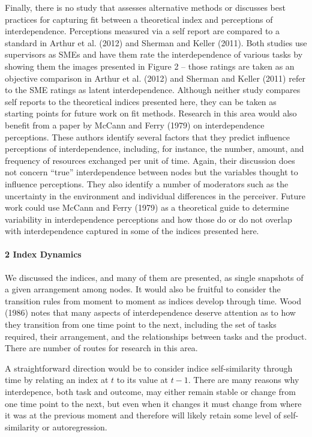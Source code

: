 \documentclass[english,,man]{apa6}
\let\oldparagraph\paragraph
\renewcommand{\paragraph}[1]{\oldparagraph{#1}\mbox{}}
\theoremstyle{definition}
\theoremstyle{definition}
\theoremstyle{definition}
\theoremstyle{remark}
\begin{document}
Finally, there is no study that assesses alternative methods or
discusses best practices for capturing fit between a theoretical index
and perceptions of interdependence. Perceptions measured via a self
report are compared to a standard in Arthur et al. (2012) and Sherman
and Keller (2011). Both studies use supervisors as SMEs and have them
rate the interdependence of various tasks by showing them the images
presented in Figure 2 -- those ratings are taken as an objective
comparison in Arthur et al. (2012) and Sherman and Keller (2011) refer
to the SME ratings as latent interdependence. Although neither study
compares self reports to the theoretical indices presented here, they
can be taken as starting points for future work on fit methods. Research
in this area would also benefit from a paper by McCann and Ferry (1979)
on interdependence perceptions. These authors identify several factors
that they predict influence perceptions of interdependence, including,
for instance, the number, amount, and frequency of resources exchanged
per unit of time. Again, their discussion does not concern
\enquote{true} interdependence between nodes but the variables thought
to influence perceptions. They also identify a number of moderators such
as the uncertainty in the environment and individual differences in the
perceiver. Future work could use McCann and Ferry (1979) as a
theoretical guide to determine variability in interdependence
perceptions and how those do or do not overlap with interdependence
captured in some of the indices presented here.

\hypertarget{index-dynamics}{%
\paragraph{2 Index Dynamics}\label{index-dynamics}}

We discussed the indices, and many of them are presented, as single
snapshots of a given arrangement among nodes. It would also be fruitful
to consider the transition rules from moment to moment as indices
develop through time. Wood (1986) notes that many aspects of
interdependence deserve attention as to how they transition from one
time point to the next, including the set of tasks required, their
arrangement, and the relationships between tasks and the product. There
are number of routes for research in this area.

A straightforward direction would be to consider indice self-similarity
through time by relating an index at \(t\) to its value at \(t-1\).
There are many reasons why interdepence, both task and outcome, may
either remain stable or change from one time point to the next, but even
when it changes it must change from where it was at the previous moment
and therefore will likely retain some level of self-similarity or
autoregression.
\end{document}
